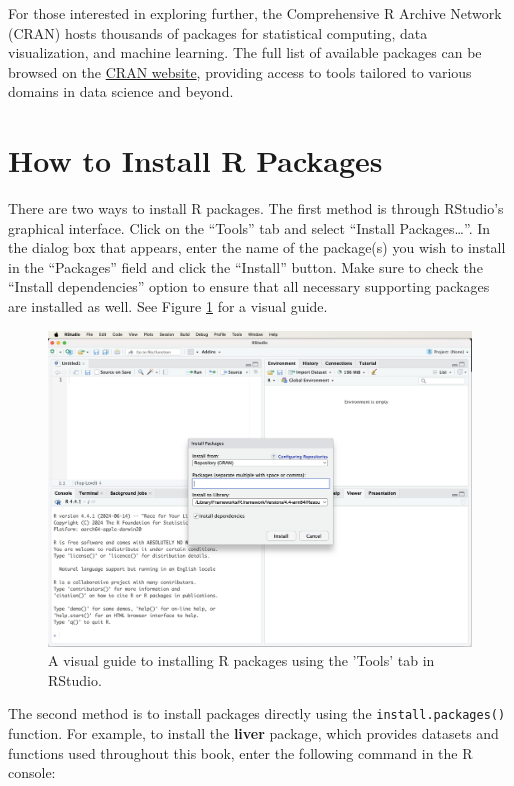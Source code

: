 \documentclass[
]{book}
\newcommand{\passthrough}[1]{#1}
\theoremstyle{definition}
\theoremstyle{definition}
\theoremstyle{definition}
\theoremstyle{definition}
\theoremstyle{remark}
\begin{document}
For those interested in exploring further, the Comprehensive R Archive Network (CRAN) hosts thousands of packages for statistical computing, data visualization, and machine learning. The full list of available packages can be browsed on the \href{https://CRAN.R-project.org}{CRAN website}, providing access to tools tailored to various domains in data science and beyond.

\section{How to Install R Packages}\label{install-packages}

There are two ways to install R packages. The first method is through RStudio's graphical interface. Click on the ``Tools'' tab and select ``Install Packages\ldots{}''. In the dialog box that appears, enter the name of the package(s) you wish to install in the ``Packages'' field and click the ``Install'' button. Make sure to check the ``Install dependencies'' option to ensure that all necessary supporting packages are installed as well. See Figure \ref{fig:install-packages} for a visual guide.

\begin{figure}

{\centering \includegraphics[width=0.7\linewidth]{images/ch1_RStudio-window-install} 

}

\caption{A visual guide to installing R packages using the 'Tools' tab in RStudio.}\label{fig:install-packages}
\end{figure}

The second method is to install packages directly using the \passthrough{\lstinline!install.packages()!} function. For example, to install the \textbf{liver} package, which provides datasets and functions used throughout this book, enter the following command in the R console:
\end{document}
